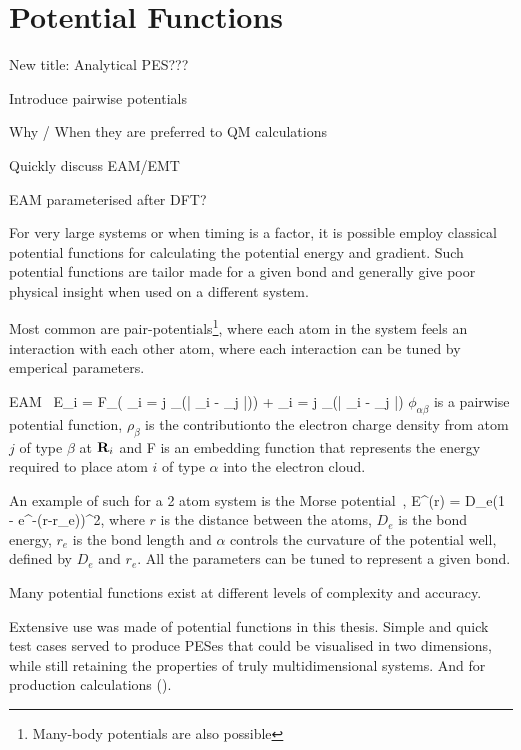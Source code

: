 \section{Potential Functions}
\label{sec:potentials}

\bit
\item New title: Analytical PES???
\item Introduce pairwise potentials
\item Why / When they are preferred to QM calculations
\item Quickly discuss EAM/EMT
\item EAM parameterised after DFT?
\eit

For very large systems or when timing is a factor, it is possible employ classical potential functions for calculating the potential energy and gradient.
Such potential functions are tailor made for a given bond and generally give poor physical insight when used on a different system.

Most common are pair-potentials\footnote{Many-body potentials are also possible}, where each atom in the system feels an interaction with each other atom, where each interaction can be tuned by emperical parameters.

EAM~\cite{eam-1983}
E_i = F_\alpha \left( \sum_{i \not= j} \rho_\beta(\left| \vR_i - \vR_j \right|)\right) +  \sum_{i \not= j}   \phi_{\alpha\beta}(\left| \vR_i - \vR_j \right|)
\eeq
$\phi_{\alpha\beta}$ is a pairwise potential function, $\rho_\beta$ is the contributionto the electron charge density from atom $j$ of type $\beta$ at ${\mathrm{\mathbf{\bm{R}}}}_i$ and F is an embedding function that represents the energy required to place atom $i$ of type $\alpha$ into the electron cloud.

An example of such for a 2 atom system is the Morse potential~\cite{morse-1929},
E^(r) = D_e(1 - e^{-\alpha(r-r_e)})^2,
\eeq
where $r$ is the distance between the atoms, $D_e$ is the bond energy, $r_e$ is the bond length and $\alpha$ controls the curvature of the potential well, defined by $D_e$ and $r_e$.
All the parameters can be tuned to represent a given bond.

Many potential functions exist at different levels of complexity and accuracy.

Extensive use was made of potential functions in this thesis.
Simple and quick test cases served to produce PESes that could be visualised in two dimensions, while still retaining the properties of truly multidimensional systems.
And for production calculations ().

